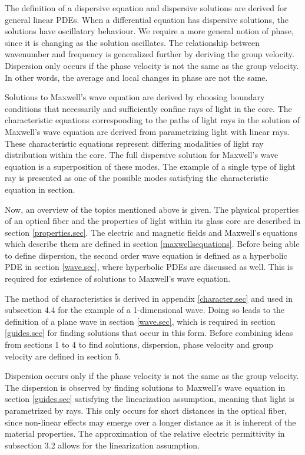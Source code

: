 \documentclass[12pt]{article}
\theoremstyle{definition}
\numberwithin{equation}{section}
\begin{document}
The definition of a dispersive equation and dispersive solutions are derived for general linear PDEs. When a differential equation has dispersive solutions, the solutions have oscillatory behaviour. We require a more general notion of phase, since it is changing as the solution oscillates. The relationship between wavenumber and frequency is generalized further by deriving the group velocity. Dispersion only occurs if the phase velocity is not the same as the group velocity. In other words, the average and local changes in phase are not the same.

Solutions to Maxwell's wave equation are derived by choosing boundary conditions that necessarily and sufficiently confine rays of light in the core. The characteristic equations corresponding to the paths of light rays in the solution of Maxwell's wave equation are derived from parametrizing light with linear rays. These characteristic equations represent differing modalities of light ray distribution within the core. The full dispersive solution for Maxwell's wave equation is a superposition of these modes. The example of a single type of light ray is presented as one of the possible modes satisfying the characteristic equation in section. 

Now, an overview of the topics mentioned above is given. The physical properties of an optical fiber and the properties of light within its glass core are described in section \ref{properties.sec}. The electric and magnetic fields and Maxwell's equations which describe them are defined in section \ref{maxwellsequations}. Before being able to define dispersion, the second order wave equation is defined as a hyperbolic PDE in section \ref{wave.sec}, where hyperbolic PDEs are discussed as well. This is required for existence of solutions to Maxwell's wave equation.

The method of characteristics is derived in appendix \ref{character.sec} and used in subsection 4.4 for the example of a 1-dimensional wave. Doing so leads to the definition of a plane wave in section \ref{wave.sec}, which is required in section \ref{guides.sec} for finding solutions that occur in this form. Before combining ideas from sections 1 to 4 to find solutions, dispersion, phase velocity and group velocity are defined in section 5.

Dispersion occurs only if the phase velocity is not the same as the group velocity. The dispersion is observed by finding solutions to Maxwell's wave equation in section \ref{guides.sec}
satisfying the linearization assumption, meaning that light is parametrized by rays. This only occurs for short distances in the optical fiber, since non-linear effects may emerge over a longer distance as it is inherent of the material properties. The approximation of the relative electric permittivity in subsection 3.2 allows for the linearization assumption.
\end{document}
